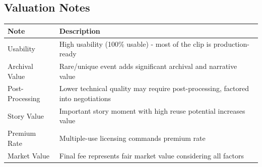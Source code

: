 \documentclass[
  11pt,
]{article}
\begin{document}
\hypertarget{valuation-notes}{%
\subsection{Valuation Notes}\label{valuation-notes}}

\begin{table}[h]
\centering
\begin{tabular}{L{3.5cm}L{10.5cm}}
\toprule
\textbf{Note} & \textbf{Description} \\
\midrule
Usability & High usability (100\% usable) - most of the clip is production-ready \\
Archival Value & Rare/unique event adds significant archival and narrative value \\
Post-Processing & Lower technical quality may require post-processing, factored into negotiations \\
Story Value & Important story moment with high reuse potential increases value \\
Premium Rate & Multiple-use licensing commands premium rate \\
Market Value & Final fee represents fair market value considering all factors \\
\bottomrule
\end{tabular}
\end{table}
\end{document}
